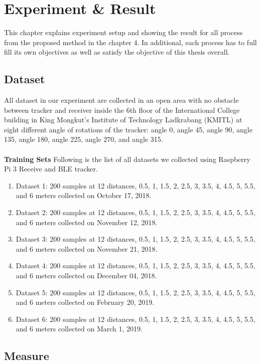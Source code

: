 \chapter{Experiment \& Result}
This chapter explains experiment setup and showing the result for all process from the proposed method in the chapter 4. In additional, each process has to full fill its own objectives as well as satisfy the objective of this thesis overall. 
\section{Dataset}
All dataset in our experiment are collected in an open area with no obstacle between tracker and receiver inside the 6th floor of the International College building in King Mongkut’s Institute of Technology Ladkrabang (KMITL) at eight different angle of rotations of the tracker: angle 0, angle 45, angle 90, angle 135, angle 180, angle 225, angle 270, and angle 315.\\
\\
\noindent \textbf{Training Sets}
\newline Following is the list of all datasets we collected using Raspberry Pi 3 Receive and BLE tracker.
\begin{enumerate}
    \item Dataset 1: 200 samples at 12 distances, 0.5, 1, 1.5, 2, 2.5, 3, 3.5, 4, 4.5, 5, 5.5, and 6 meters collected on October 17, 2018.
    \item Dataset 2: 200 samples at 12 distances, 0.5, 1, 1.5, 2, 2.5, 3, 3.5, 4, 4.5, 5, 5.5, and 6 meters collected on November 12, 2018.
    \item Dataset 3: 200 samples at 12 distances, 0.5, 1, 1.5, 2, 2.5, 3, 3.5, 4, 4.5, 5, 5.5, and 6 meters collected on November 21, 2018.
    \item Dataset 4: 200 samples at 12 distances, 0.5, 1, 1.5, 2, 2.5, 3, 3.5, 4, 4.5, 5, 5.5, and 6 meters collected on December 04, 2018.
    \item Dataset 5: 200 samples at 12 distances, 0.5, 1, 1.5, 2, 2.5, 3, 3.5, 4, 4.5, 5, 5.5, and 6 meters collected on February 20, 2019.
    \item Dataset 6: 200 samples at 12 distances, 0.5, 1, 1.5, 2, 2.5, 3, 3.5, 4, 4.5, 5, 5.5, and 6 meters collected on March 1, 2019.
\end{enumerate}
\section{Measure}
